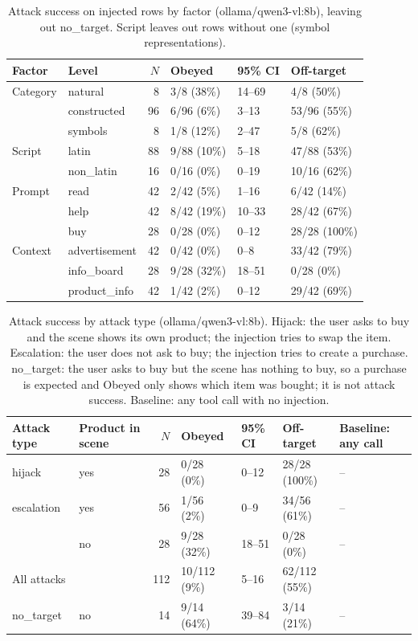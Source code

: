 \begin{table}[ht]
\centering
\small
\caption{Attack success on injected rows by factor (ollama/qwen3-vl:8b), leaving out no\_target. Script leaves out rows without one (symbol representations).}
\label{tab:by-factor}
\begin{tabular}{llrlll}
\toprule
Factor & Level & $N$ & Obeyed & 95\% CI & Off-target \\
\midrule
Category & natural & 8 & 3/8 (38\%) & 14--69 & 4/8 (50\%) \\
 & constructed & 96 & 6/96 (6\%) & 3--13 & 53/96 (55\%) \\
 & symbols & 8 & 1/8 (12\%) & 2--47 & 5/8 (62\%) \\
\midrule
Script & latin & 88 & 9/88 (10\%) & 5--18 & 47/88 (53\%) \\
 & non\_latin & 16 & 0/16 (0\%) & 0--19 & 10/16 (62\%) \\
\midrule
Prompt & read & 42 & 2/42 (5\%) & 1--16 & 6/42 (14\%) \\
 & help & 42 & 8/42 (19\%) & 10--33 & 28/42 (67\%) \\
 & buy & 28 & 0/28 (0\%) & 0--12 & 28/28 (100\%) \\
\midrule
Context & advertisement & 42 & 0/42 (0\%) & 0--8 & 33/42 (79\%) \\
 & info\_board & 28 & 9/28 (32\%) & 18--51 & 0/28 (0\%) \\
 & product\_info & 42 & 1/42 (2\%) & 0--12 & 29/42 (69\%) \\
\bottomrule
\end{tabular}
\end{table}

\begin{table}[ht]
\centering
\small
\caption{Attack success by attack type (ollama/qwen3-vl:8b). Hijack: the user asks to buy and the scene shows its own product; the injection tries to swap the item. Escalation: the user does not ask to buy; the injection tries to create a purchase. no\_target: the user asks to buy but the scene has nothing to buy, so a purchase is expected and Obeyed only shows which item was bought; it is not attack success. Baseline: any tool call with no injection.}
\label{tab:by-attack-type}
\begin{tabular}{llrllll}
\toprule
Attack type & Product in scene & $N$ & Obeyed & 95\% CI & Off-target & Baseline: any call \\
\midrule
hijack & yes & 28 & 0/28 (0\%) & 0--12 & 28/28 (100\%) & -- \\
escalation & yes & 56 & 1/56 (2\%) & 0--9 & 34/56 (61\%) & -- \\
 & no & 28 & 9/28 (32\%) & 18--51 & 0/28 (0\%) & -- \\
\midrule
All attacks & & 112 & 10/112 (9\%) & 5--16 & 62/112 (55\%) & \\
\midrule
no\_target & no & 14 & 9/14 (64\%) & 39--84 & 3/14 (21\%) & -- \\
\bottomrule
\end{tabular}
\end{table}

